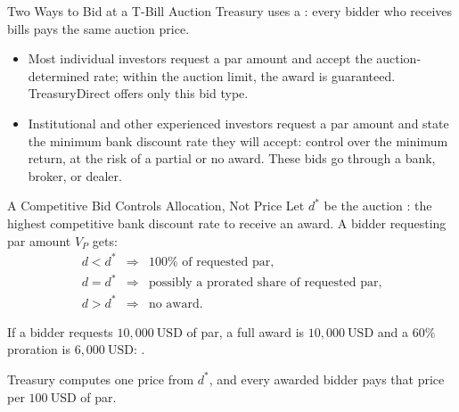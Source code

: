 \documentclass[aspectratio=169,11pt]{beamer}
\begin{document}
\begin{frame}{Two Ways to Bid at a T-Bill Auction}
  Treasury uses a : every bidder who receives bills
  pays the same auction price.

  \vspace{0.6em}
  \begin{itemize}\setlength{\itemsep}{0.7em}
    \item \textbf{} Most individual investors request a
      par amount and accept the auction-determined rate; within the auction
      limit, the award is guaranteed. TreasuryDirect offers only this bid type.
    \item \textbf{} Institutional and other experienced
      investors request a par amount and state the minimum bank discount rate
      they will accept: control over the minimum return, at the risk of a
      partial or no award. These bids go through a bank, broker, or dealer.
  \end{itemize}

\end{frame}

\begin{frame}{A Competitive Bid Controls Allocation, Not Price}
  Let $d^*$ be the auction : the highest competitive bank
  discount rate to receive an award. A bidder requesting par amount $V_P$ gets:
  \[
    \begin{array}{ccl}
      d<d^* &\Longrightarrow& 100\%\text{ of requested par},\\[0.25em]
      d=d^* &\Longrightarrow& \text{possibly a prorated share of requested par},\\[0.25em]
      d>d^* &\Longrightarrow& \text{no award}.
    \end{array}
  \]

  If a bidder requests $10{,}000~\mathrm{USD}$ of par, a full award is
  $10{,}000~\mathrm{USD}$ and a $60\%$ proration is $6{,}000~\mathrm{USD}$:
  .

  \vspace{0.4em}
  Treasury computes one price from $d^*$, and every awarded bidder pays that
  price per $100~\mathrm{USD}$ of par.

\end{frame}
\end{document}
